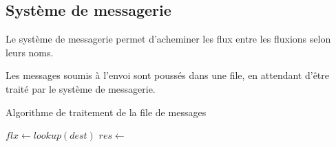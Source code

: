 



\subsection{Système de messagerie}

Le système de messagerie permet d'acheminer les flux entre les fluxions selon leurs noms.



Les messages soumis à l'envoi sont poussés dans une file, en attendant d'être traité par le système de messagerie.

\begin{algorithm}
\caption{Algorithme de traitement de la file de messages}
\begin{algorithmic}
\State $flx \gets lookup(dest)$
\State $res \gets$ 
\State {}
\EndFor
\EndFunction
\end{algorithmic}
\end{algorithm}

